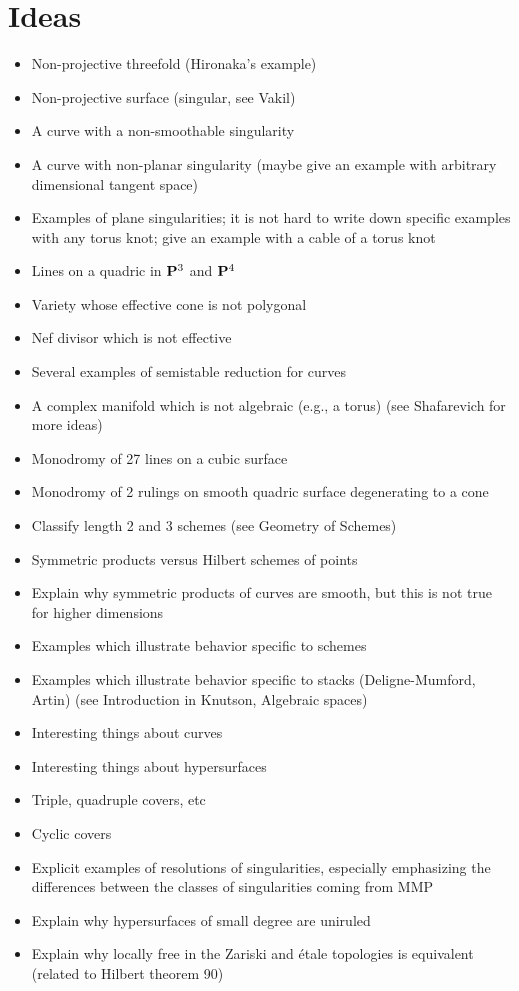\chapter{Ideas}

\begin{itemize}
\item Non-projective threefold (Hironaka's example)
\item Non-projective surface (singular, see Vakil)
\item A curve with a non-smoothable singularity
\item A curve with non-planar singularity (maybe give an example with arbitrary dimensional tangent space)
\item Examples of plane singularities; it is not hard to write down specific examples with any torus knot; give an example with a cable of a torus knot
\item Lines on a quadric in $\mathbf{P}^3$ and $\mathbf{P}^4$
\item Variety whose effective cone is not polygonal
\item Nef divisor which is not effective
\item Several examples of semistable reduction for curves
\item A complex manifold which is not algebraic (e.g., a torus) (see Shafarevich for more ideas)
\item Monodromy of 27 lines on a cubic surface
\item Monodromy of 2 rulings on smooth quadric surface degenerating to a cone
\item Classify length 2 and 3 schemes (see Geometry of Schemes)
\item Symmetric products versus Hilbert schemes of points
\item Explain why symmetric products of curves are smooth, but this is not true for higher dimensions
\item Examples which illustrate behavior specific to schemes
\item Examples which illustrate behavior specific to stacks (Deligne-Mumford, Artin) (see Introduction in Knutson, Algebraic spaces)
\item Interesting things about curves
\item Interesting things about hypersurfaces
\item Triple, quadruple covers, etc
\item Cyclic covers
\item Explicit examples of resolutions of singularities, especially emphasizing the differences between the classes of singularities coming from MMP
\item Explain why hypersurfaces of small degree are uniruled
\item Explain why locally free in the Zariski and \'etale topologies is equivalent (related to Hilbert theorem 90)
\end{itemize}

